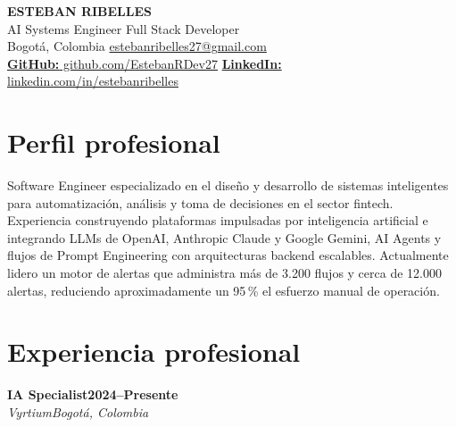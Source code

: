 \documentclass[10pt,letterpaper]{article}
\newcommand{\role}[4]{%
  \textbf{#1}\hfill\textbf{#2}\\
  \textit{#3}\hfill\textit{#4}\vspace{1pt}
}
\begin{document}
\begin{center}
  {\LARGE\bfseries ESTEBAN RIBELLES}\\[3pt]
  {\large AI Systems Engineer \textbar{} Full Stack Developer}\\[4pt]
  Bogot\'a, Colombia \enspace\textbar\enspace
  \href{mailto:estebanribelles27@gmail.com}{estebanribelles27@gmail.com}\\[2pt]
  \href{https://github.com/EstebanRDev27}{\textbf{GitHub:} github.com/EstebanRDev27}
  \enspace\textbar\enspace
  \href{https://linkedin.com/in/estebanribelles}{\textbf{LinkedIn:} linkedin.com/in/estebanribelles}
\end{center}

\section{Perfil profesional}

Software Engineer especializado en el dise\~no y desarrollo de sistemas inteligentes para automatizaci\'on, an\'alisis y toma de decisiones en el sector fintech. Experiencia construyendo plataformas impulsadas por inteligencia artificial e integrando LLMs de OpenAI, Anthropic Claude y Google Gemini, AI Agents y flujos de Prompt Engineering con arquitecturas backend escalables. Actualmente lidero un motor de alertas que administra m\'as de 3.200 flujos y cerca de 12.000 alertas, reduciendo aproximadamente un 95\,\% el esfuerzo manual de operaci\'on.

\section{Experiencia profesional}

\role{IA Specialist}{2024--Presente}{Vyrtium}{Bogot\'a, Colombia}
\end{document}
